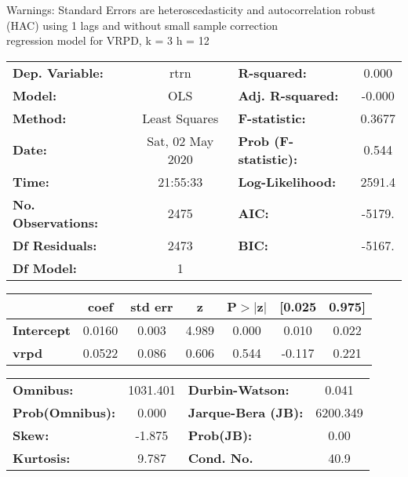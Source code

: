 Warnings: \newline
 [1] Standard Errors are heteroscedasticity and autocorrelation robust (HAC) using 1 lags and without small sample correction\\ 

regression model for VRPD, k = 3 h = 12\begin{center}
\begin{tabular}{lclc}
\toprule
\textbf{Dep. Variable:}    &       rtrn       & \textbf{  R-squared:         } &     0.000   \\
\textbf{Model:}            &       OLS        & \textbf{  Adj. R-squared:    } &    -0.000   \\
\textbf{Method:}           &  Least Squares   & \textbf{  F-statistic:       } &    0.3677   \\
\textbf{Date:}             & Sat, 02 May 2020 & \textbf{  Prob (F-statistic):} &    0.544    \\
\textbf{Time:}             &     21:55:33     & \textbf{  Log-Likelihood:    } &    2591.4   \\
\textbf{No. Observations:} &        2475      & \textbf{  AIC:               } &    -5179.   \\
\textbf{Df Residuals:}     &        2473      & \textbf{  BIC:               } &    -5167.   \\
\textbf{Df Model:}         &           1      & \textbf{                     } &             \\
\bottomrule
\end{tabular}
\begin{tabular}{lcccccc}
                   & \textbf{coef} & \textbf{std err} & \textbf{z} & \textbf{P$> |$z$|$} & \textbf{[0.025} & \textbf{0.975]}  \\
\midrule
\textbf{Intercept} &       0.0160  &        0.003     &     4.989  &         0.000        &        0.010    &        0.022     \\
\textbf{vrpd}      &       0.0522  &        0.086     &     0.606  &         0.544        &       -0.117    &        0.221     \\
\bottomrule
\end{tabular}
\begin{tabular}{lclc}
\textbf{Omnibus:}       & 1031.401 & \textbf{  Durbin-Watson:     } &    0.041  \\
\textbf{Prob(Omnibus):} &   0.000  & \textbf{  Jarque-Bera (JB):  } & 6200.349  \\
\textbf{Skew:}          &  -1.875  & \textbf{  Prob(JB):          } &     0.00  \\
\textbf{Kurtosis:}      &   9.787  & \textbf{  Cond. No.          } &     40.9  \\
\bottomrule
\end{tabular}
\end{center}

